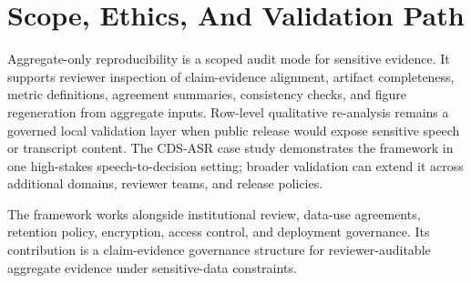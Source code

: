 \section{Scope, Ethics, And Validation Path}

Aggregate-only reproducibility is a scoped audit mode for sensitive evidence. It supports reviewer inspection of claim-evidence alignment, artifact completeness, metric definitions, agreement summaries, consistency checks, and figure regeneration from aggregate inputs. Row-level qualitative re-analysis remains a governed local validation layer when public release would expose sensitive speech or transcript content. The CDS-ASR case study demonstrates the framework in one high-stakes speech-to-decision setting; broader validation can extend it across additional domains, reviewer teams, and release policies.

The framework works alongside institutional review, data-use agreements, retention policy, encryption, access control, and deployment governance. Its contribution is a claim-evidence governance structure for reviewer-auditable aggregate evidence under sensitive-data constraints.
